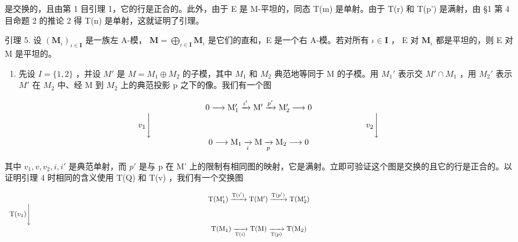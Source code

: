 是交换的，且由第 1 目引理 1，它的行是正合的。此外，由于 E 是 M-平坦的，同态 T(m) 是单射。由于 T(r) 和 T(p') 是满射，由 §1 第 4 目命题 2 的推论 2 得 T(n) 是单射，这就证明了引理。

引理 5. 设 \((\mathbf{M}_{\iota})_{\iota \in \mathbf{I}}\) 是一族左 A-模， \(\mathbf{M} = \bigoplus_{\iota \in \mathbf{I}} \mathbf{M}_{\iota}\) 是它们的直和，E 是一个右 A-模。若对所有 \(\iota \in \mathbf{I}\) ， E 对 \(\mathbf{M}_{\iota}\) 都是平坦的，则 E 对 M 是平坦的。

\begin{enumerate}
\def\labelenumi{(\alph{enumi})}
\tightlist
\item
  先设 \(I = \{1, 2\}\) ，并设 \(M'\) 是 \(M = M_{1} \oplus M_{2}\) 的子模，其中 \(M_{1}\) 和 \(M_{2}\) 典范地等同于 M 的子模。用 \(M_{1}'\) 表示交 \(M' \cap M_{1}\) ，用 \(M_{2}'\) 表示 \(M'\) 在 \(M_{2}\) 中、经 M 到 \(M_{2}\) 上的典范投影 p 之下的像。我们有一个图
\end{enumerate}

\[
\begin{array}{c} 0 \longrightarrow \mathrm{M} _ {1} ^ {\prime} \xrightarrow {i ^ {\prime}} \mathrm{M} ^ {\prime} \xrightarrow {p ^ {\prime}} \mathrm{M} _ {2} ^ {\prime} \longrightarrow 0 \\ v _ {1} \Biggl \downarrow \qquad \qquad \qquad \qquad \qquad \qquad \qquad \qquad \qquad \qquad \qquad \qquad \qquad v _ {2} \Biggl \downarrow \\ 0 \longrightarrow \mathrm{M} _ {1} \xrightarrow [ i ]{} \mathrm{M} \xrightarrow [ p ]{} \mathrm{M} _ {2} \longrightarrow 0 \end{array}
\]

其中 \(v_{1}, v, v_{2}, i, i'\) 是典范单射，而 \(p'\) 是与 p 在 M' 上的限制有相同图的映射，它是满射。立即可验证这个图是交换的且它的行是正合的。以证明引理 4 时相同的含义使用 T(Q) 和 T(v) ，我们有一个交换图

\[
\begin{array}{c} \mathrm{T} (\mathrm{M} _ {1} ^ {\prime}) \xrightarrow {\mathrm{T} (i ^ {\prime})} \mathrm{T} (\mathrm{M} ^ {\prime}) \xrightarrow {\mathrm{T} (p ^ {\prime})} \mathrm{T} (\mathrm{M} _ {2} ^ {\prime}) \\ \mathrm{T} (v _ {1}) \Biggl \downarrow \qquad \qquad \qquad \qquad \qquad \qquad \qquad \qquad \qquad \qquad \qquad \qquad \qquad \qquad \qquad \qquad \qquad \qquad \qquad \qquad \qquad \qquad \qquad \qquad \qquad \qquad \qquad \qquad \qquad \qquad \qquad \qquad \qquad \qquad \\ \mathrm{T} (\mathrm{M} _ {1}) \xrightarrow [ \mathrm{T} (i) ]{} \mathrm{T} (\mathrm{M}) \xrightarrow [ \mathrm{T} (p) ]{} \mathrm{T} (\mathrm{M} _ {2}) \end{array}
\]

